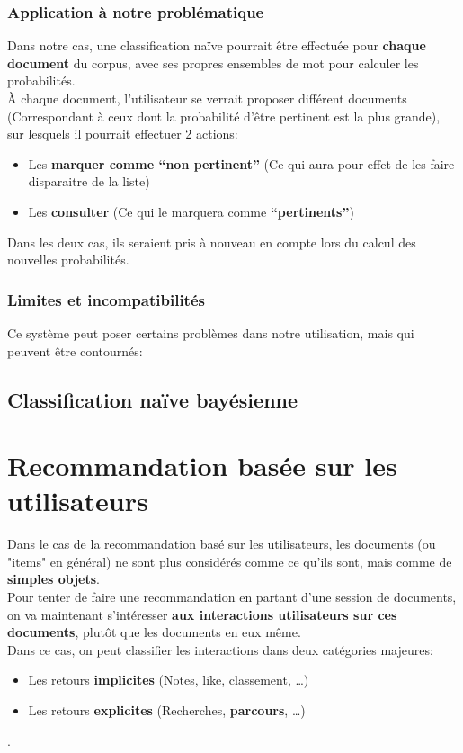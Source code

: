             \subsubsection{Application à notre problématique}
                Dans notre cas, une classification naïve pourrait être effectuée pour \textbf{chaque document} du corpus, avec ses propres ensembles de mot pour calculer les probabilités.\\
                À chaque document, l'utilisateur se verrait proposer différent documents (Correspondant à ceux dont la probabilité d'être pertinent est la plus grande), sur lesquels il pourrait effectuer 2 actions:
                \begin{itemize}
                    \item Les \textbf{marquer comme ``non pertinent''} (Ce qui aura pour effet de les faire disparaitre de la liste)
                    \item Les \textbf{consulter} (Ce qui le marquera comme \textbf{``pertinents''})
                \end{itemize}
                Dans les deux cas, ils seraient pris à nouveau en compte lors du calcul des nouvelles probabilités.
            \subsubsection{Limites et incompatibilités}
                Ce système peut poser certains problèmes dans notre utilisation, mais qui peuvent être contournés: %
        \subsection{Classification naïve bayésienne}
    \section{Recommandation basée sur les utilisateurs}
        Dans le cas de la recommandation basé sur les utilisateurs, les documents (ou "items" en général) ne sont plus considérés comme ce qu'ils sont, mais comme de \textbf{simples objets}.\\
        Pour tenter de faire une recommandation en partant d'une session de documents, on va maintenant s'intéresser \textbf{aux interactions utilisateurs sur ces documents}, plutôt que les documents en eux même.\\

        Dans ce cas, on peut classifier les interactions dans deux catégories majeures:
        \begin{itemize}
            \item Les retours \textbf{implicites} (Notes, like, classement, \ldots)
            \item Les retours \textbf{explicites} (Recherches, \textbf{parcours}, \ldots)
        \end{itemize}.\\
